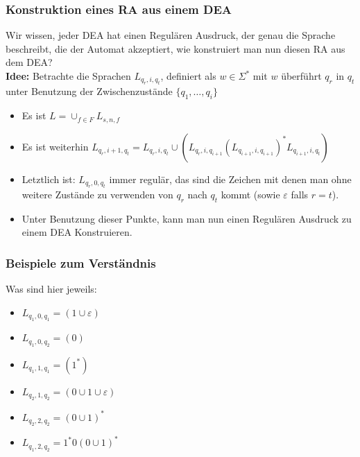 \documentclass{beamer}
\begin{document}
\begin{frame}
\frametitle{Konstruktion eines RA aus einem DEA}
Wir wissen, jeder DEA hat einen Regulären Ausdruck, der genau die Sprache beschreibt, die der Automat akzeptiert, wie konstruiert man nun diesen RA aus dem DEA?\\[0.6cm]
\textbf{Idee:} Betrachte die Sprachen $L_{q_r,i,q_t}$, definiert als \( w \in \Sigma^*\) mit $w$ überführt $q_r$ in $q_t$ unter Benutzung der Zwischenzustände $\{q_1,\ldots,q_i\}$
\begin{itemize}
\item Es ist $L = \cup_{f\in F} L_{s,n,f}$
\item Es ist weiterhin $L_{q_r,i+1,q_t} = L_{q_r,i,q_t} \cup (L_{q_r,i,q_{i+1}}(L_{q_{i+1},i,q_{i+1}})^*L_{q_{i+1},i,q_t})$
\item Letztlich ist: $L_{q_r, 0, q_t}$ immer regulär, das sind die Zeichen mit denen man ohne weitere Zustände zu verwenden von $q_r$ nach $q_t$ kommt (sowie $\varepsilon$ falls $r = t$).
\item Unter Benutzung dieser Punkte, kann man nun einen Regulären Ausdruck zu einem DEA Konstruieren.
\end{itemize}
\end{frame}
\begin{frame}
\frametitle{Beispiele zum Verständnis}
\vspace{-1cm}
\begin{figure}[H]
\begin{center}
\end{center}
\end{figure}
Was sind hier jeweils:
\begin{itemize}
\item $L_{q_1,0,q_1}$\pause $ = (1\cup\varepsilon)$
\item $L_{q_1,0,q_2}$\pause $ = (0)$
\item $L_{q_1,1,q_1}$\pause $ = (1^*)$
\item $L_{q_2,1,q_2}$\pause $ = (0\cup1\cup\varepsilon)$
\item $L_{q_2,2,q_2}$\pause $ = (0\cup1)^*$
\item $L_{q_1,2,q_2}$\pause $ = 1^*0(0\cup1)^*$
\end{itemize}
\end{frame}
\end{document}
